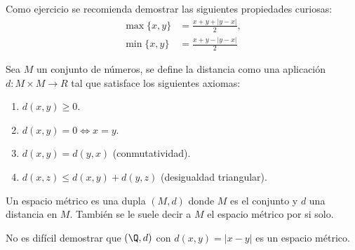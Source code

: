 \documentclass[11pt,oneside,a4paper]{book}
\begin{document}
Como ejercicio se recomienda demostrar las siguientes propiedades curiosas:
\begin{align*}
	\max\{x,y\}&=\frac{x+y+|y-x|}{2},\\
	\min\{x,y\}&=\frac{x+y-|y-x|}{2}
\end{align*}
\begin{mydef}[Distancia]
	Sea $M$ un conjunto de números, se define la distancia como una aplicación $d:M\times M\rightarrow R$ tal que satisface los siguientes axiomas:
	\begin{enumerate}[(1)]
		\item $d(x,y)\geq 0$.
		\item $d(x,y)=0\iff x=y$.
		\item $d(x,y)=d(y,x)$ (conmutatividad).
		\item $d(x,z)\leq d(x,y)+d(y,z)$ (desigualdad triangular).
	\end{enumerate}
	Un espacio métrico es una dupla $(M,d)$ donde $M$ es el conjunto y $d$ una distancia en $M$. También se le suele decir a $M$ el espacio métrico por si solo.
\end{mydef}
No es difícil demostrar que $(\Q,d)$ con $d(x,y)=|x-y|$ es un espacio métrico.
\end{document}
